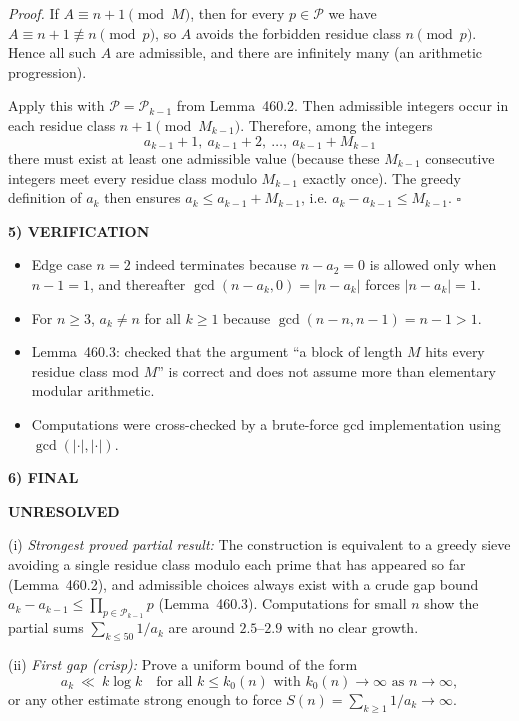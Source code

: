 \textit{Proof.}
If $A\equiv n+1\pmod M$, then for every $p\in\mathcal P$ we have $A\equiv n+1\not\equiv n\pmod p$, so $A$ avoids the forbidden residue class $n\pmod p$. Hence all such $A$ are admissible, and there are infinitely many (an arithmetic progression).

Apply this with $\mathcal P=\mathcal P_{k-1}$ from Lemma~460.2. Then admissible integers occur in each residue class $n+1\pmod {M_{k-1}}$. Therefore, among the integers
\[a_{k-1}+1,\ a_{k-1}+2,\ \dots,\ a_{k-1}+M_{k-1}\]
there must exist at least one admissible value (because these $M_{k-1}$ consecutive integers meet every residue class modulo $M_{k-1}$ exactly once). The greedy definition of $a_k$ then ensures $a_k\le a_{k-1}+M_{k-1}$, i.e. $a_k-a_{k-1}\le M_{k-1}$. \hfill$\square$

\medskip
\noindent\textbf{5) VERIFICATION}

\begin{itemize}
\item Edge case $n=2$ indeed terminates because $n-a_2=0$ is allowed only when $n-1=1$, and thereafter $\gcd(n-a_k,0)=|n-a_k|$ forces $|n-a_k|=1$.
\item For $n\ge 3$, $a_k\neq n$ for all $k\ge 1$ because $\gcd(n-n,n-1)=n-1>1$.
\item Lemma~460.3: checked that the argument ``a block of length $M$ hits every residue class mod $M$'' is correct and does not assume more than elementary modular arithmetic.
\item Computations were cross-checked by a brute-force gcd implementation using $\gcd(|\cdot|,|\cdot|)$.
\end{itemize}

\noindent\textbf{6) FINAL}

\textbf{UNRESOLVED}

(i) \emph{Strongest proved partial result:} The construction is equivalent to a greedy sieve avoiding a single residue class modulo each prime that has appeared so far (Lemma~460.2), and admissible choices always exist with a crude gap bound $a_k-a_{k-1}\le \prod_{p\in\mathcal P_{k-1}}p$ (Lemma~460.3). Computations for small $n$ show the partial sums $\sum_{k\le 50}1/a_k$ are around $2.5$--$2.9$ with no clear growth.

(ii) \emph{First gap (crisp):} Prove a uniform bound of the form
\[a_k\ \ll\ k\log k\quad\text{for all }k\le k_0(n)\text{ with }k_0(n)\to\infty\text{ as }n\to\infty,
\]
or any other estimate strong enough to force $S(n)=\sum_{k\ge 1}1/a_k\to\infty$.

